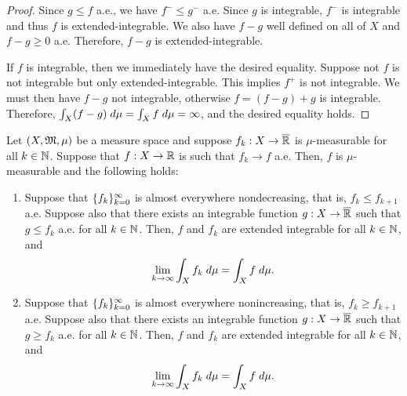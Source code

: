 \documentclass[a4paper]{article}
\begin{document}
\begin{proof}
Since $g \leq f$ a.e., we have $f^- \leq g^-$ a.e. Since 
$g$ is integrable, $f^-$ is integrable and thus $f$ is 
extended-integrable. We also have $f - g$ well defined 
on all of $X$ and $f - g \geq 0$ a.e. Therefore, 
$f - g$ is extended-integrable. 

If $f$ is integrable, then we immediately have the desired 
equality. Suppose not $f$ is not integrable but only 
extended-integrable. This implies $f^+$ is not integrable.
We must then have $f - g$ not integrable, otherwise 
$f = (f - g) + g$ is integrable. Therefore, 
$\int_X (f - g) \; d \mu = \int_X f \; d \mu = \infty$,
and the desired equality holds.
\end{proof}

\begin{thm}
Let $(X, \mathfrak{M}, \mu)$ be a measure space and suppose 
$f_k : X \to \overline{\mathbb{R}}$ is $\mu$-measurable for 
all $k \in \mathbb{N}$. Suppose that 
$f: X \to \mathbb{R}$ is such that $f_k \to f$ a.e. Then, 
$f$ is $\mu$-measurable and the following holds: 
\begin{enumerate}
\item Suppose that $\{ f_k \}_{k=0}^\infty$ is almost everywhere
nondecreasing, that is, $f_k \leq f_{k+1}$ a.e. Suppose 
also that there exists an integrable function 
$g : X \to \overline{\mathbb{R}}$ such that $g \leq f_k$ a.e. for all $k \in \mathbb{N}$.
Then, $f$ and $f_k$ are extended integrable for all $k \in \mathbb{N}$, 
and 
\[
\lim_{k \to \infty} \int_X f_k \; d \mu = \int_X f \; d \mu.
\]

\item Suppose that $\{ f_k \}_{k=0}^\infty$ is almost everywhere
nonincreasing, that is, $f_k \geq f_{k+1}$ a.e. Suppose 
also that there exists an integrable function 
$g : X \to \overline{\mathbb{R}}$ such that $g \geq f_k$ a.e. for all $k \in \mathbb{N}$.
Then, $f$ and $f_k$ are extended integrable for all $k \in \mathbb{N}$, 
and 
\[
\lim_{k \to \infty} \int_X f_k \; d \mu = \int_X f \; d \mu.
\]
\end{enumerate}
\end{thm}
\end{document}

